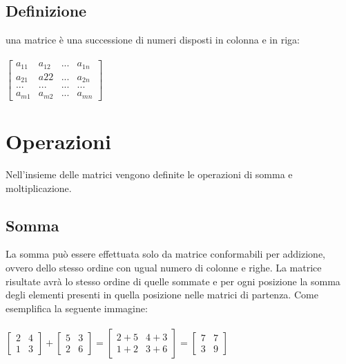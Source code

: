 \documentclass[a4paper]{article}
\begin{document}
\subsection{Definizione}

una matrice è una successione di numeri disposti in colonna e in riga:
\\
\\
	$\left[\begin{matrix}a_{11} & a_{12} & ... & a_{1n} \\ a_{21} & a{22} & ... & a_{2n} \\ ... & ... & ... & ...\\ a_{m1} & a_{m2} & ... & a_{mn}\end{matrix}\right]
$


\section{Operazioni}
Nell'insieme delle matrici vengono definite le operazioni di somma e moltiplicazione.

\subsection{Somma}
La somma può essere effettuata solo da matrice conformabili per addizione, ovvero dello stesso ordine con ugual numero di colonne e righe. La matrice risultate avrà lo stesso ordine di quelle sommate e per ogni posizione la somma degli elementi presenti in quella posizione nelle matrici di partenza. Come esemplifica la seguente immagine:
\\
\\
$\left[\begin{matrix}2 & 4 \\ 1 & 3\end{matrix}\right] + \left[\begin{matrix}5 & 3 \\ 2 & 6\end{matrix}\right] = \left[\begin{matrix} 2+5 & 4+3 \\ 1+2 & 3+6\end{matrix}\right] = \left[\begin{matrix}7 & 7 \\ 3 & 9\end{matrix}\right]
$
\\
\end{document}
